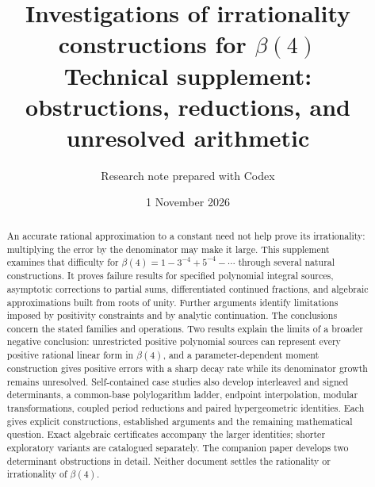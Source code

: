 \documentclass[11pt]{article}
\title{Investigations of irrationality constructions for $\beta(4)$\\
\large Technical supplement: obstructions, reductions, and unresolved arithmetic}
\author{\normalsize Research note prepared with Codex}
\date{1 November 2026}
\theoremstyle{remark}\newtheorem{remark}[theorem]{Remark}
\numberwithin{equation}{section}
\begin{document}
\maketitle
\begin{abstract}
An accurate rational approximation to a constant need not help prove
its irrationality: multiplying the error by the denominator may make
it large. This supplement examines that difficulty for
$\beta(4)=1-3^{-4}+5^{-4}-\cdots$ through several natural constructions.
It proves failure results for specified polynomial integral sources,
asymptotic corrections to partial sums, differentiated continued
fractions, and algebraic approximations built from roots of unity.
Further arguments identify limitations imposed by positivity constraints
and by analytic continuation. The conclusions concern the stated
families and operations. Two results explain the limits of a broader
negative conclusion: unrestricted positive polynomial sources can
represent every positive rational linear form in $\beta(4)$, and a
parameter-dependent moment construction gives positive errors with a
sharp decay rate while its denominator growth remains unresolved.
Self-contained case studies also develop interleaved and signed
determinants, a common-base polylogarithm ladder, endpoint interpolation,
modular transformations, coupled period reductions and paired hypergeometric
identities. Each gives explicit constructions, established arguments and
the remaining mathematical question. Exact algebraic certificates accompany
the larger identities; shorter exploratory variants are catalogued separately. The companion paper develops two
determinant obstructions in detail. Neither document settles the
rationality or irrationality of $\beta(4)$.
\end{abstract}
\clearpage
\tableofcontents
\clearpage


















\appendix


\end{document}
